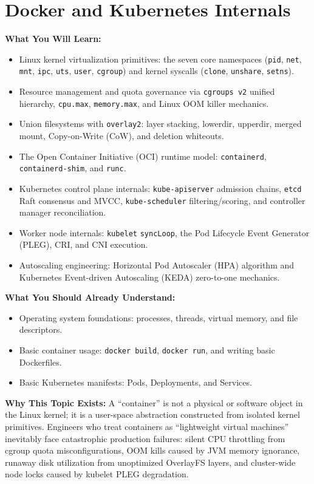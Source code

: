 \chapter{Docker and Kubernetes Internals}
\label{ch:docker-kubernetes}

\begin{chaptergoalsbox}
\textbf{What You Will Learn:}
\begin{itemize}[leftmargin=12pt]
  \item Linux kernel virtualization primitives: the seven core namespaces (\texttt{pid}, \texttt{net}, \texttt{mnt}, \texttt{ipc}, \texttt{uts}, \texttt{user}, \texttt{cgroup}) and kernel syscalls (\texttt{clone}, \texttt{unshare}, \texttt{setns}).
  \item Resource management and quota governance via \texttt{cgroups v2} unified hierarchy, \texttt{cpu.max}, \texttt{memory.max}, and Linux OOM killer mechanics.
  \item Union filesystems with \texttt{overlay2}: layer stacking, lowerdir, upperdir, merged mount, Copy-on-Write (CoW), and deletion whiteouts.
  \item The Open Container Initiative (OCI) runtime model: \texttt{containerd}, \texttt{containerd-shim}, and \texttt{runc}.
  \item Kubernetes control plane internals: \texttt{kube-apiserver} admission chains, \texttt{etcd} Raft consensus and MVCC, \texttt{kube-scheduler} filtering/scoring, and controller manager reconciliation.
  \item Worker node internals: \texttt{kubelet} \texttt{syncLoop}, the Pod Lifecycle Event Generator (PLEG), CRI, and CNI execution.
  \item Autoscaling engineering: Horizontal Pod Autoscaler (HPA) algorithm and Kubernetes Event-driven Autoscaling (KEDA) zero-to-one mechanics.
\end{itemize}

\textbf{What You Should Already Understand:}
\begin{itemize}[leftmargin=12pt]
  \item Operating system foundations: processes, threads, virtual memory, and file descriptors.
  \item Basic container usage: \texttt{docker build}, \texttt{docker run}, and writing basic Dockerfiles.
  \item Basic Kubernetes manifests: Pods, Deployments, and Services.
\end{itemize}

\textbf{Why This Topic Exists:}
A ``container'' is not a physical or software object in the Linux kernel; it is a user-space abstraction constructed from isolated kernel primitives. Engineers who treat containers as ``lightweight virtual machines'' inevitably face catastrophic production failures: silent CPU throttling from cgroup quota misconfigurations, OOM kills caused by JVM memory ignorance, runaway disk utilization from unoptimized OverlayFS layers, and cluster-wide node locks caused by kubelet PLEG degradation.


\end{chaptergoalsbox}
